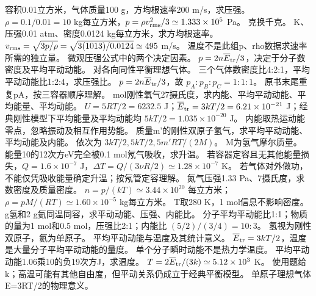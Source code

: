 \problemtext 容积0.01立方米，气体质量100 g，方均根速率200 m/s，求压强。
\workings $\rho=0.1/0.01=10$ kg每立方米，$p=\rho v_{\rm rms}^2/3\simeq1.333\times10^5$ Pa。
\crosscheck 克换千克。
 K、压强0.01 atm、密度0.0124 kg每立方米，求方均根速率。
\workings $v_{\rm rms}=\sqrt{3p/\rho}=\sqrt{3(1013)/0.0124}\simeq495$ m/s。
\crosscheck 温度不是此组p、rho数据求速率所需的独立量。
\problemtext 微观压强公式中的两个决定因素。
\workings $p=2n\overline E_{\rm tr}/3$，决定于分子数密度及平均平动动能。
\crosscheck 对各向同性平衡理想气体。
\problemtext 三个气体数密度比4:2:1，平均平动动能比1:2:4，求压强比。
\workings $p=2n\overline E_{\rm tr}/3$，故 $p_A:p_B:p_C=1:1:1$。
\crosscheck 原书末尾重复pA，按三容器顺序理解。
 mol刚性氧气27摄氏度，求内能、平均平动动能、平均能量、平均动能。
\workings $U=5RT/2=6232.5$ J；$\overline E_{\rm tr}=3kT/2=6.21\times10^{-21}$ J；经典刚性模型下平均能量及平均动能均 $5kT/2=1.035\times10^{-20}$ J。
\crosscheck 内能取热运动能零点，忽略振动及相互作用势能。
\problemtext 质量m'的刚性双原子氢气，求平均平动动能、平均动能及内能。
\workings 依次为 $3kT/2,5kT/2,5m'RT/(2M)$。
\crosscheck M为氢气摩尔质量。
\problemtext 能量10的12次方eV完全被0.1 mol氖气吸收，求升温。
\workings 若容器定容且无其他能量损失，$Q=1.6\times10^{-7}$ J，$\Delta T=Q/(3\nu R/2)\simeq1.28\times10^{-7}$ K。
\crosscheck 若气体对外做功，不能仅凭吸收能量确定升温；按氖管定容理解。
\problemtext 氮气压强1.33 Pa、7摄氏度，求数密度及质量密度。
\workings $n=p/(kT)\simeq3.44\times10^{20}$ 每立方米；$\rho=pM/(RT)\simeq1.60\times10^{-5}$ kg每立方米。
\crosscheck T取280 K，1 mol信息不影响密度。
 g氢和2 g氦同温同容，求平动动能、压强、内能比。
\workings 分子平均平动能比1:1；物质的量为1 mol和0.5 mol，压强比2:1；内能比 $(5/2)/(3/4)=10:3$。
\crosscheck 氢视为刚性双原子，氦为单原子。
\problemtext 平均平动动能与温度及其统计意义。
\workings $\overline E_{\rm tr}=3kT/2$，温度是大量分子平均平动动能的量度。
\crosscheck 单个分子瞬时动能不是热力学温度。
\problemtext 平均平动动能1.06乘10的负19次方J，求温度。
\workings $T=2\overline E_{\rm tr}/(3k)\simeq5.12\times10^3$ K。
\crosscheck 使用题给k；高温可能有其他自由度，但平动关系仍成立于经典平衡模型。
\problemtext 单原子理想气体E=3RT/2的物理意义。
